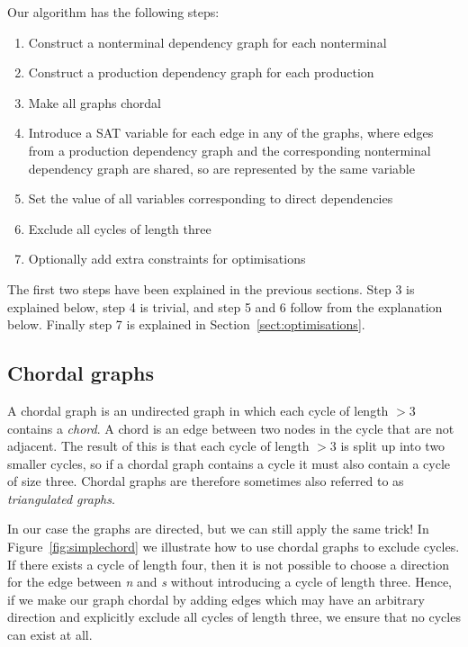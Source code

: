 \documentclass{llncs}
\newcommand{\figref}[1]{Figure~\ref{#1}}
\newcommand{\sectref}[1]{Section~\ref{#1}}
\begin{document}
Our algorithm has the following steps:
\begin{enumerate}
\item Construct a nonterminal dependency graph for each nonterminal
\item Construct a production dependency graph for each production
\item Make all graphs chordal
\item Introduce a SAT variable for each edge in any of the graphs, where edges from a production dependency graph and the corresponding nonterminal dependency graph are shared, so are represented by the same variable
\item Set the value of all variables corresponding to direct dependencies
\item Exclude all cycles of length three
\item Optionally add extra constraints for optimisations
\end{enumerate}
The first two steps have been explained in the previous sections. Step 3 is explained below, step 4 is trivial, and step 5 and 6 follow from the explanation below. Finally step 7 is explained in \sectref{sect:optimisations}.

\subsection{Chordal graphs}
A chordal graph is an undirected graph in which each cycle of length $> 3$ contains a \emph{chord}. A chord is an edge between two nodes in the cycle that are not adjacent. The result of this is that each cycle of length $> 3$ is split up into two smaller cycles, so if a chordal graph contains a cycle it must also contain a cycle of size three. Chordal graphs are therefore sometimes also referred to as \emph{triangulated graphs}.


In our case the graphs are directed, but we can still apply the same trick! In \figref{fig:simplechord} we illustrate how to use chordal graphs to exclude cycles. If there exists a cycle of length four, then it is not possible to choose a direction for the edge between \emph{n} and \emph{s} without introducing a cycle of length three. Hence, if we make our graph chordal by adding edges which may have an arbitrary direction and explicitly exclude all cycles of length three, we ensure that no cycles can exist at all.
\end{document}
